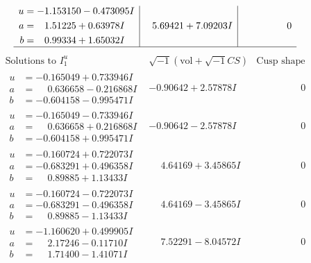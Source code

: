\documentclass[1p]{elsarticle_modified}
\theoremstyle{definition}
\newcommand{\I}{\sqrt{-1}}
\begin{document}
$$\begin{array}{c|c|c}
\begin{aligned}
u &= -1.153150 - 0.473095 I \\
a &= \phantom{-}1.51225 + 0.63978 I \\
b &= \phantom{-}0.99334 + 1.65032 I\end{aligned}
 & \phantom{-}5.69421 + 7.09203 I & \phantom{-0.000000 } 0\\
 \hline 
 \end{array}$$\newpage$$\begin{array}{c|c|c}  
\text{Solutions to }I^u_{1}& \I (\text{vol} + \sqrt{-1}CS) & \text{Cusp shape}\\
 \hline 
\begin{aligned}
u &= -0.165049 + 0.733946 I \\
a &= \phantom{-}0.636658 - 0.216868 I \\
b &= -0.604158 - 0.995471 I\end{aligned}
 & -0.90642 + 2.57878 I & \phantom{-0.000000 } 0 \\ \hline\begin{aligned}
u &= -0.165049 - 0.733946 I \\
a &= \phantom{-}0.636658 + 0.216868 I \\
b &= -0.604158 + 0.995471 I\end{aligned}
 & -0.90642 - 2.57878 I & \phantom{-0.000000 } 0 \\ \hline\begin{aligned}
u &= -0.160724 + 0.722073 I \\
a &= -0.683291 + 0.496358 I \\
b &= \phantom{-}0.89885 + 1.13433 I\end{aligned}
 & \phantom{-}4.64169 + 3.45865 I & \phantom{-0.000000 } 0 \\ \hline\begin{aligned}
u &= -0.160724 - 0.722073 I \\
a &= -0.683291 - 0.496358 I \\
b &= \phantom{-}0.89885 - 1.13433 I\end{aligned}
 & \phantom{-}4.64169 - 3.45865 I & \phantom{-0.000000 } 0 \\ \hline\begin{aligned}
u &= -1.160620 + 0.499905 I \\
a &= \phantom{-}2.17246 - 0.11710 I \\
b &= \phantom{-}1.71400 - 1.41071 I\end{aligned}
 & \phantom{-}7.52291 - 8.04572 I & \phantom{-0.000000 } 0 \\ \hline\begin{aligned}

\end{aligned}
\end{array}$$
\end{document}
